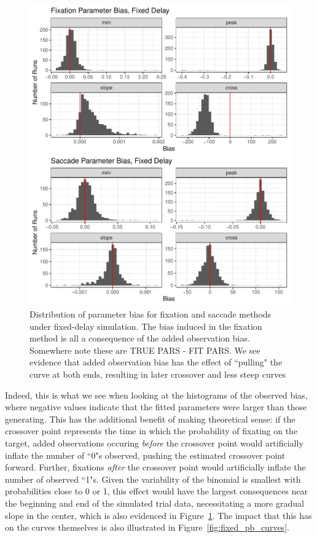 \documentclass{article}
\begin{document}
\begin{figure}[H]
\centering
\includegraphics{fixed_delay_par_bias.pdf}
\caption{Distribution of parameter bias for fixation and saccade methods under fixed-delay simulation. The bias induced in the fixation method is all a consequence of the added observation bias. Somewhere note these are TRUE PARS - FIT PARS. We see evidence that added observation bias has the effect of ``pulling" the curve at both ends, resulting in later crossover and less steep curves}
\label{fig:fixed_par_bias}
\end{figure}

Indeed, this is what we see when looking at the histograms of the observed bias, where negative values indicate that the fitted parameters were larger than those generating. This has the additional benefit of making theoretical sense: if the crossover point represents the time in which the probability of fixating on the target, added observations occuring \textit{before} the crossover point would artificially inflate the number of ``0"s observed, pushing the estimated crossover point forward. Further, fixations \textit{after} the crossover point would artificially inflate the number of observed  ``1"s. Given the variability of the binomial is smallest with probabilities close to 0 or 1, this effect would have the largest consequences near the beginning and end of the simulated trial data, necessitating a more gradual slope in the center, which is also evidenced in Figure~\ref{fig:fixed_par_bias}. The impact that this has on the curves themselves is also illustrated in Figure~\ref{fig:fixed_pb_curves}.
\end{document}
